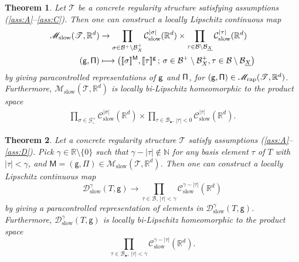 \documentclass[JEP,XML,SOM,Unicode,published]{cedram}
\newcommand\mto{\mathchoice{\longmapsto}{\mapsto}{\mapsto}{\mapsto}}
\newcommand{\sbullet}{{\scriptscriptstyle\bullet}}
\theoremstyle{plain}
\newtheorem{thm}{Theorem}
\theoremstyle{definition}
\newcommand{\Brac}[1]{[\![#1]\!]}
\newcommand{\rap}{\mathrm{rap}}
\newcommand{\slow}{\mathrm{slow}}
\newcommand{\sfM}{\mathsf{M}}
\newcommand{\sfg}{\mathsf{g}}
\newcommand{\sfPi}{\mathsf{\Pi}}
\newcommand{\scrM}{\mathscr{M}}
\newcommand{\scrT}{\mathscr{T}}
\newcommand{\bbN}{\mathbb{N}}
\newcommand{\bbR}{\mathbb{R}}
\newcommand{\mcB}{\mathcal{B}}
\newcommand{\mcC}{\mathcal{C}}
\newcommand{\mcD}{\mathcal{D}}
\newcommand{\mcG}{\mathcal{G}}
\begin{document}
\begin{thm}
Let $\scrT$ be a concrete regularity structure satisfying assumptions \hbox{\textup{(\ref{ass:A}--\ref{ass:C})}}. Then one can construct a locally Lipschitz continuous map
\begin{equation} \begin{split}
\scrM_\slow(\scrT, \bbR^d) &\to
\prod_{\sigma\in\mcB^+\setminus\mcB_X^+} \mcC_\slow^{|\sigma|}(\bbR^d) \times \prod_{\tau\in\mcB\setminus\mcB_{\underline{X}}} \mcC_\slow^{|\tau|}(\bbR^d) \\
{\sf (g,\Pi)} &\mto \bigl(\Brac{\sigma}^{\sf M}, \Brac{\tau}^{\sf g}\,;\, \sigma\in\mcB^+\setminus\mcB_X^+, \tau\in\mcB\setminus\mcB_{\underline{X}} \bigr)
\end{split} \end{equation}
by giving paracontrolled representations of $\sf g$ and $\sf \Pi$, for $({\sf g}, {\sf \Pi})\in \scrM_\rap(\scrT, \bbR^d)$. Furthermore, $\scrM_\slow(\scrT, \bbR^d)$ is locally bi-Lipschitz homeomorphic to the product space
\begin{align*}
\prod_{\sigma\in\mcG_\circ^+} \mcC_\slow^{|\sigma|}(\bbR^d) \times \prod_{\tau\in\mcB_\sbullet,\,|\tau|<0} \mcC_\slow^{|\tau|}(\bbR^d).
\end{align*}
\end{thm}

\begin{thm}
Let a concrete regularity structure $\scrT$ satisfy assumptions \textup{(\ref{ass:A}--\ref{ass:D})}. Pick $\gamma\in\bbR\setminus\{0\}$ such that $\gamma-|\tau|\notin\bbN$ for any basis element $\tau$ of $T$ with $|\tau|<\gamma$, and $\sfM=(\sfg,\sfPi)\in\scrM_\slow(\scrT, \bbR^d)$. Then one can construct a locally Lipschitz continuous map
\[
\mcD_\slow^\gamma(T,\sfg) \to \prod_{\tau\in\mcB,\, |\tau|<\gamma} \mcC_\slow^{\gamma-|\tau|}(\bbR^d)
\]
by giving a paracontrolled representation of elements in $\mcD_\slow^\gamma(T,\sfg)$. Furthermore, $\mcD_\slow^\gamma(T, \sfg)$ is locally bi-Lipschitz homeomorphic to the product space
\[
\prod_{\tau\in\mcB_\sbullet,\, |\tau|<\gamma} \mcC_\slow^{\gamma-|\tau|}(\bbR^d).
\]
\end{thm}

\backmatter


\end{document}
